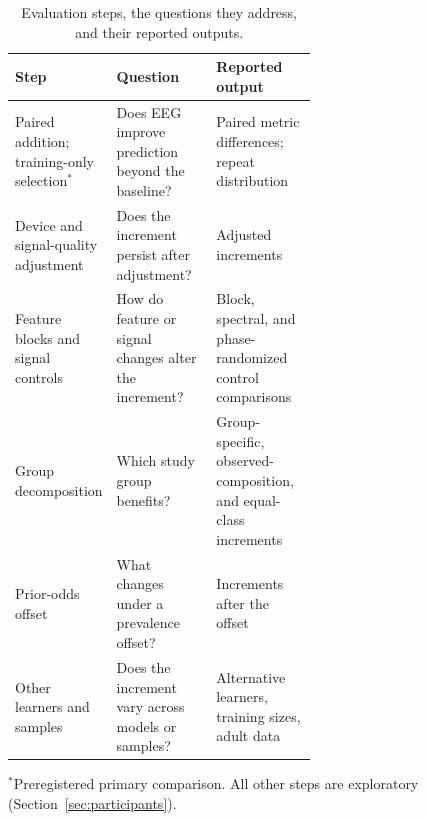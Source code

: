 \begin{table}[t]
\centering
\begin{minipage}{0.88\textwidth}
\caption{Evaluation steps, the questions they address, and their reported outputs.}
\label{tab:workflow}
\setlength{\tabcolsep}{4pt}
\renewcommand{\arraystretch}{1.03}
\begin{tabularx}{\linewidth}{@{}>{\raggedright\arraybackslash}p{0.27\linewidth}>{\raggedright\arraybackslash}p{0.33\linewidth}>{\raggedright\arraybackslash}X@{}}
\toprule
Step & Question & Reported output \\
\midrule
Paired addition; training-only selection$^{*}$ & Does EEG improve prediction beyond the baseline? & Paired metric differences; repeat distribution \\
\addlinespace[2pt]
Device and signal-quality adjustment & Does the increment persist after adjustment? & Adjusted increments \\
\addlinespace[2pt]
Feature blocks and signal controls & How do feature or signal changes alter the increment? & Block, spectral, and phase-randomized control comparisons \\
\addlinespace[2pt]
Group decomposition & Which study group benefits? & Group-specific, observed-composition, and equal-class increments \\
\addlinespace[2pt]
Prior-odds offset & What changes under a prevalence offset? & Increments after the offset \\
\addlinespace[2pt]
Other learners and samples & Does the increment vary across models or samples? & Alternative learners, training sizes, adult data \\
\bottomrule
\end{tabularx}
\par\smallskip
$^{*}$Preregistered primary comparison. All other steps are exploratory (Section~\ref{sec:participants}).
\end{minipage}
\end{table}
